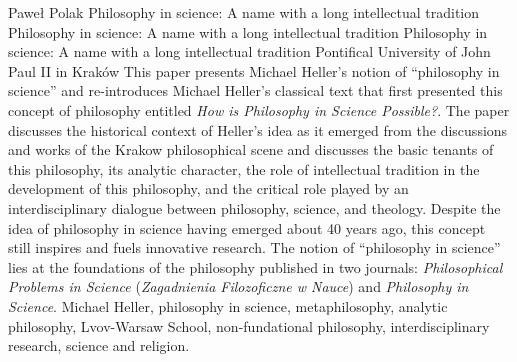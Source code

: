 \begin{artengenv}{Paweł Polak}
	{Philosophy in science: A name with a long intellectual tradition}
	{Philosophy in science: A name with a long intellectual tradition}
	{Philosophy in science: A name with a long intellectual tradition}
	{Pontifical University of John Paul II in Kraków}
	{This paper presents Michael Heller’s notion of ``philosophy in science'' and re-introduces Michael Heller’s classical
		text that first presented this concept of philosophy entitled \textit{How is Philosophy in Science
			Possible?}. The paper discusses the historical context of Heller’s idea as it emerged from the discussions and works of
		the Krakow philosophical scene and discusses the basic tenants of this philosophy, its analytic character, the role of
		intellectual tradition in the development of this philosophy, and the critical role played by an interdisciplinary
		dialogue between philosophy, science, and theology. Despite the idea of philosophy in science having emerged about 40
		years ago, this concept still inspires and fuels innovative research. The notion of ``philosophy in science'' lies at the
		foundations of the philosophy published in two journals: \textit{Philosophical Problems in Science}
		(\textit{Zagadnienia Filozoficzne w Nauce}) and \textit{Philosophy in Science}.}
	{Michael Heller, philosophy in science, metaphilosophy, analytic philosophy, Lvov-Warsaw School, non-fundational philosophy, interdisciplinary research, science and religion.}







\end{artengenv}
